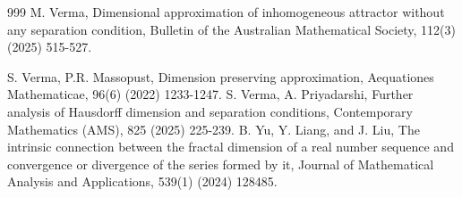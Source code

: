\documentclass[12pt,oneside,reqno]{amsart}
\theoremstyle{definition}
\theoremstyle{remark}
\begin{document}
\begin{thebibliography}{999}
 M. Verma, Dimensional approximation of inhomogeneous attractor without any separation condition, Bulletin of the Australian Mathematical Society, 112(3) (2025) 515-527.

 S. Verma, P.R. Massopust, Dimension preserving approximation, Aequationes Mathematicae, 96(6) (2022) 1233-1247.
 S. Verma, A. Priyadarshi, Further analysis of Hausdorff dimension and separation conditions, Contemporary Mathematics (AMS), 825 (2025) 225-239.
 B. Yu, Y. Liang, and J. Liu, The intrinsic connection between the fractal dimension of a real number sequence and convergence or divergence of the series formed by it, Journal of Mathematical Analysis and Applications, 539(1) (2024) 128485.
\end{thebibliography}
\end{document}

